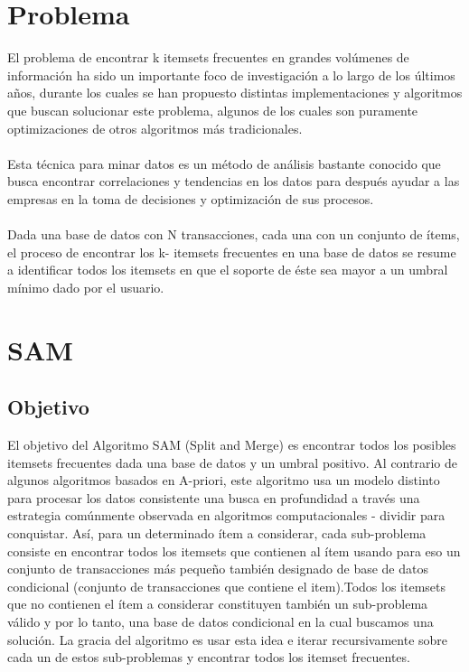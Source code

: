 \documentclass[12pt,spanish]{article}
\begin{document}
\section{Problema}

El problema de encontrar k itemsets frecuentes en grandes volúmenes de información ha sido un importante foco de investigación a lo largo de los últimos años, durante los cuales se han propuesto distintas implementaciones y algoritmos que buscan solucionar este problema, algunos de los cuales son puramente optimizaciones de otros algoritmos más tradicionales.
\\\\
Esta técnica para minar datos es un método de análisis bastante conocido que busca encontrar correlaciones y tendencias en los datos para después ayudar a las empresas en la toma de decisiones  y optimización de sus procesos.
\\\\
Dada una base de datos con N transacciones, cada una con un conjunto de ítems, el proceso de encontrar los k- itemsets frecuentes en una base de datos se resume a identificar todos los itemsets en que el soporte de éste sea mayor a un umbral mínimo dado por el usuario. 

\section{SAM}
\subsection{Objetivo}
El objetivo del Algoritmo SAM (Split and Merge)  es encontrar todos los posibles itemsets frecuentes dada una base de datos y un umbral positivo. Al contrario de algunos algoritmos basados en A-priori, este algoritmo usa un modelo distinto para procesar los datos consistente una busca en profundidad a través una estrategia comúnmente observada en algoritmos computacionales - dividir para conquistar. Así, para un determinado ítem a considerar, cada sub-problema consiste en encontrar todos los itemsets que contienen al ítem usando para eso un conjunto de transacciones  más pequeño también designado de base de datos condicional (conjunto de transacciones que contiene el item).Todos los itemsets que no contienen el ítem a considerar constituyen también un sub-problema válido y por lo tanto, una base de datos condicional en la cual buscamos una solución. La gracia del algoritmo es usar esta idea e iterar recursivamente sobre cada un de estos sub-problemas y encontrar todos los itemset frecuentes.
\end{document}

